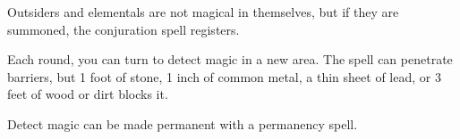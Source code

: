 {

	Outsiders and elementals are not magical in themselves, but if they are summoned, the conjuration spell registers.

	Each round, you can turn to detect magic in a new area. The spell can penetrate barriers, but 1 foot of stone, 1 inch of common metal, a thin sheet of lead, or 3 feet of wood or dirt blocks it.

	Detect magic can be made permanent with a permanency spell.

}
